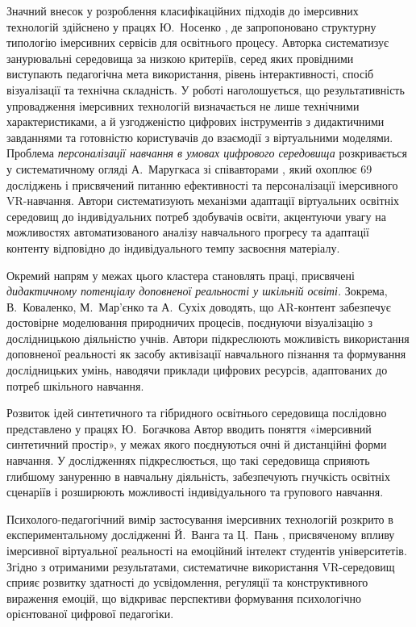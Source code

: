Значний внесок у розроблення класифікаційних підходів до імерсивних технологій здійснено у працях Ю.~Носенко \cite{Nosenko2024Typology}, де запропоновано структурну типологію імерсивних сервісів для освітнього процесу. Авторка систематизує занурювальні середовища за низкою критеріїв, серед яких провідними виступають педагогічна мета використання, рівень інтерактивності, спосіб візуалізації та технічна складність. У роботі наголошується, що результативність упровадження імерсивних технологій визначається не лише технічними характеристиками, а й узгодженістю цифрових інструментів з дидактичними завданнями та готовністю користувачів до взаємодії з віртуальними моделями. Проблема \emph{персоналізації навчання в умовах цифрового середовища} розкривається у систематичному огляді А.~Маругкаса зі співавторами \cite{Gurska2025Personalized}, який охоплює 69 досліджень і присвячений питанню ефективності та персоналізації імерсивного VR-навчання. Автори систематизують механізми адаптації віртуальних освітніх середовищ до індивідуальних потреб здобувачів освіти, акцентуючи увагу на можливостях автоматизованого аналізу навчального прогресу та адаптації контенту відповідно до індивідуального темпу засвоєння матеріалу.

Окремий напрям у межах цього кластера становлять праці, присвячені \emph{дидактичному потенціалу доповненої реальності у шкільній освіті.} Зокрема, В.~Коваленко, М.~Мар'єнко та А.~Сухіх \cite{Pinchuk2022AR} доводять, що AR-контент забезпечує достовірне моделювання природничих процесів, поєднуючи візуалізацію з дослідницькою діяльністю учнів. Автори підкреслюють можливість використання доповненої реальності як засобу активізації навчального пізнання та формування дослідницьких умінь, наводячи приклади цифрових ресурсів, адаптованих до потреб шкільного навчання.

Розвиток ідей синтетичного та гібридного освітнього середовища послідовно представлено у працях Ю.~Богачкова \cite{Bogachkov2023Immersive} Автор вводить поняття «імерсивний синтетичний простір», у межах якого поєднуються очні й дистанційні форми навчання. У дослідженнях підкреслюється, що такі середовища сприяють глибшому зануренню в навчальну діяльність, забезпечують гнучкість освітніх сценаріїв і розширюють можливості індивідуального та групового навчання.

Психолого-педагогічний вимір застосування імерсивних технологій розкрито в експериментальному дослідженні Й.~Ванга та Ц.~Пань \cite{Lytvynova2025Emotional}, присвяченому впливу імерсивної віртуальної реальності на емоційний інтелект студентів університетів. Згідно з отриманими результатами, систематичне використання VR-середовищ сприяє розвитку здатності до усвідомлення, регуляції та конструктивного вираження емоцій, що відкриває перспективи формування психологічно орієнтованої цифрової педагогіки.

